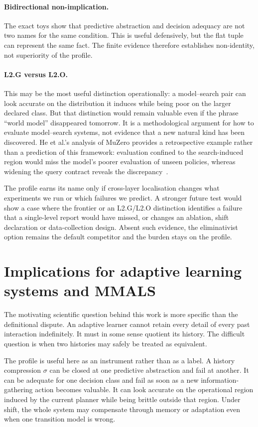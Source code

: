 \documentclass[10pt]{article}
\begin{document}
\paragraph{Bidirectional non-implication.}
The exact toys show that predictive abstraction and decision adequacy are not two names for the same condition. This is useful defensively, but the flat tuple can represent the same fact. The finite evidence therefore establishes non-identity, not superiority of the profile.

\paragraph{L2.G versus L2.O.}
This may be the most useful distinction operationally: a model--search pair can look accurate on the distribution it induces while being poor on the larger declared class. But that distinction would remain valuable even if the phrase ``world model'' disappeared tomorrow. It is a methodological argument for how to evaluate model--search systems, not evidence that a new natural kind has been discovered. He et al.'s analysis of MuZero provides a retrospective example rather than a prediction of this framework: evaluation confined to the search-induced region would miss the model's poorer evaluation of unseen policies, whereas widening the query contract reveals the discrepancy~\cite{he2024}.

The profile earns its name only if cross-layer localisation changes what experiments we run or which failures we predict. A stronger future test would show a case where the frontier or an L2.G/L2.O distinction identifies a failure that a single-level report would have missed, or changes an ablation, shift declaration or data-collection design. Absent such evidence, the eliminativist option remains the default competitor and the burden stays on the profile.

\section{Implications for adaptive learning systems and MMALS}

The motivating scientific question behind this work is more specific than the definitional dispute. An adaptive learner cannot retain every detail of every past interaction indefinitely. It must in some sense quotient its history. The difficult question is when two histories may safely be treated as equivalent.

The profile is useful here as an instrument rather than as a label. A history compression $\sigma$ can be closed at one predictive abstraction and fail at another. It can be adequate for one decision class and fail as soon as a new information-gathering action becomes valuable. It can look accurate on the operational region induced by the current planner while being brittle outside that region. Under shift, the whole system may compensate through memory or adaptation even when one transition model is wrong.
\end{document}
